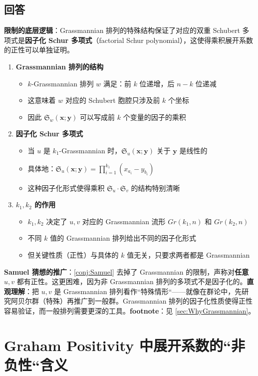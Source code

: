 \subsection{回答}
\textbf{限制的底层逻辑}：Grassmannian 排列的特殊结构保证了对应的双重 Schubert 多项式是\textbf{因子化 Schur 多项式}（factorial Schur polynomial），这使得乘积展开系数的正性可以单独证明。
\begin{enumerate}
\item \textbf{Grassmannian 排列的结构}
\begin{itemize}
\item $k$-Grassmannian 排列 $w$ 满足：前 $k$ 位递增，后 $n-k$ 位递减\item 这意味着 $w$ 对应的 Schubert 胞腔只涉及前 $k$ 个坐标\item 因此 $\mathfrak{S}_w(\mathbf{x}; \mathbf{y})$ 可以写成前 $k$ 个变量的因子的乘积
\end{itemize}\item \textbf{因子化 Schur 多项式}
\begin{itemize}
\item 当 $u$ 是 $k_1$-Grassmannian 时，$\mathfrak{S}_u(\mathbf{x}; \mathbf{y})$ 关于 $\mathbf{y}$ 是线性的\item 具体地：$\mathfrak{S}_u(\mathbf{x}; \mathbf{y}) = \prod_{i=1}^{k_1} (x_{a_i} - y_{b_i})$\item 这种因子化形式使得乘积 $\mathfrak{S}_u \cdot \mathfrak{S}_v$ 的结构特别清晰
\end{itemize}\item \textbf{$k_1, k_2$ 的作用}
\begin{itemize}
\item $k_1, k_2$ 决定了 $u, v$ 对应的 Grassmannian 流形 $Gr(k_1, n)$ 和 $Gr(k_2, n)$\item 不同 $k$ 值的 Grassmannian 排列给出不同的因子化形式\item 但关键性质（正性）与具体的 $k$ 值无关，只要求两者都是 Grassmannian
\end{itemize}
\end{enumerate}

\textbf{ Samuel 猜想的推广}：\cref{conj:Samuel} 去掉了 Grassmannian 的限制，声称对\textbf{任意} $u, v$ 都有正性。这更困难，因为非 Grassmannian 排列的多项式不是因子化的。\textbf{直观理解}：把 $u, v$ 是 Grassmannian 排列看作``特殊情形``——就像在群论中，先研究阿贝尔群（特殊）再推广到一般群。Grassmannian 排列的因子化性质使得正性容易验证，而一般排列需要更深的工具。\textbf{footnote}：见 \cref{sec:WhyGrassmannian}。
\section{Graham Positivity 中展开系数的``非负性``含义}\label{sec:GrahamPositivityCoefficientMeaning}
